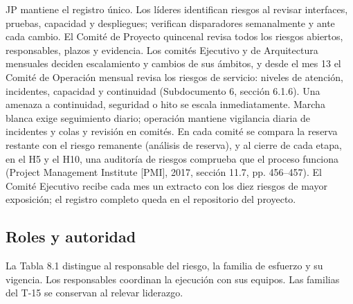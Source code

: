 JP mantiene el registro único. Los líderes identifican riesgos al revisar interfaces, pruebas, capacidad y despliegues; verifican disparadores semanalmente y ante cada cambio. El Comité de Proyecto quincenal revisa todos los riesgos abiertos, responsables, plazos y evidencia. Los comités Ejecutivo y de Arquitectura mensuales deciden escalamiento y cambios de sus ámbitos, y desde el mes 13 el Comité de Operación mensual revisa los riesgos de servicio: niveles de atención, incidentes, capacidad y continuidad (Subdocumento 6, sección 6.1.6). Una amenaza a continuidad, seguridad o hito se escala inmediatamente. Marcha blanca exige seguimiento diario; operación mantiene vigilancia diaria de incidentes y colas y revisión en comités. En cada comité se compara la reserva restante con el riesgo remanente (análisis de reserva), y al cierre de cada etapa, en el H5 y el H10, una auditoría de riesgos comprueba que el proceso funciona (Project Management Institute [PMI], 2017, sección 11.7, pp. 456–457). El Comité Ejecutivo recibe cada mes un extracto con los diez riesgos de mayor exposición; el registro completo queda en el repositorio del proyecto.

\subsection{Roles y autoridad}

La Tabla 8.1 distingue al responsable del riesgo, la familia de esfuerzo y su vigencia. Los responsables coordinan la ejecución con sus equipos. Las familias del T-15 se conservan al relevar liderazgo.

